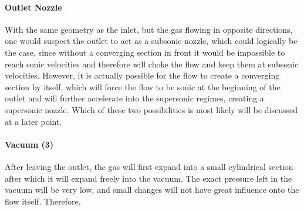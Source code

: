 \paragraph{Outlet Nozzle}
	
	With the same geometry as the inlet, but the gas flowing in opposite directions, one would suspect the outlet to act as a subsonic nozzle, which could logically be the case, since without a converging section in front it would be impossible to reach sonic velocities and therefore will choke the flow and keep them at subsonic velocities.
	However, it is actually possible for the flow to create a converging section by itself, which will force the flow to be sonic at the beginning of the outlet and will further accelerate into the supersonic regimes, creating a supersonic nozzle.
	Which of these two possibilities is most likely will be discussed at a later point.
	
\paragraph{Vacuum (3)}

	After leaving the outlet, the gas will first expand into a small cylindrical section after which it will expand freely into the vacuum.
	The exact pressure left in the vacuum will be very low, and small changes will not have great influence onto the flow itself.
	Therefore,

\newpage

